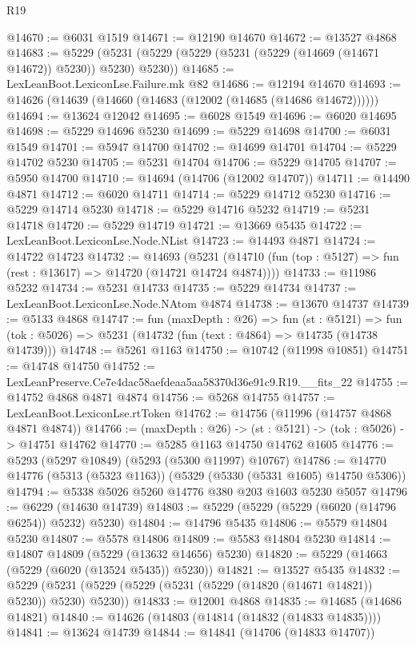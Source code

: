 \begin{lexlean}{R19}
\begin{coremodule}
@14670 := @6031 @1519
@14671 := @12190 @14670
@14672 := @13527 @4868
@14683 := @5229 (@5231 (@5229 (@5229 (@5231 (@5229 (@14669 (@14671 @14672)) @5230)) @5230) @5230))
@14685 := LexLeanBoot.LexiconLse.Failure.mk @82
@14686 := @12194 @14670
@14693 := @14626 (@14639 (@14660 (@14683 (@12002 (@14685 (@14686 @14672))))))
@14694 := @13624 @12042
@14695 := @6028 @1549
@14696 := @6020 @14695
@14698 := @5229 @14696 @5230
@14699 := @5229 @14698
@14700 := @6031 @1549
@14701 := @5947 @14700
@14702 := @14699 @14701
@14704 := @5229 @14702 @5230
@14705 := @5231 @14704
@14706 := @5229 @14705
@14707 := @5950 @14700
@14710 := @14694 (@14706 (@12002 @14707))
@14711 := @14490 @4871
@14712 := @6020 @14711
@14714 := @5229 @14712 @5230
@14716 := @5229 @14714 @5230
@14718 := @5229 @14716 @5232
@14719 := @5231 @14718
@14720 := @5229 @14719
@14721 := @13669 @5435
@14722 := LexLeanBoot.LexiconLse.Node.NList
@14723 := @14493 @4871
@14724 := @14722 @14723
@14732 := @14693
    (@5231 (@14710 (fun (top : @5127) => fun (rest : @13617) => @14720 (@14721 @14724 @4874))))
@14733 := @11986 @5232
@14734 := @5231 @14733
@14735 := @5229 @14734
@14737 := LexLeanBoot.LexiconLse.Node.NAtom @4874
@14738 := @13670 @14737
@14739 := @5133 @4868
@14747 := fun (maxDepth : @26) =>
  fun (st : @5121) =>
  fun (tok : @5026) => @5231 (@14732 (fun (text : @4864) => @14735 (@14738 @14739)))
@14748 := @5261 @1163
@14750 := @10742 (@11998 @10851)
@14751 := @14748 @14750
@14752 := LexLeanPreserve.Ce7e4dac58aefdeaa5aa58370d36e91c9.R19.__fits_22
@14755 := @14752 @4868 @4871 @4874
@14756 := @5268 @14755
@14757 := LexLeanBoot.LexiconLse.rtToken
@14762 := @14756 (@11996 (@14757 @4868 @4871 @4874))
@14766 := (maxDepth : @26) -> (st : @5121) -> (tok : @5026) -> @14751 @14762
@14770 := @5285 @1163 @14750 @14762 @1605
@14776 := @5293 (@5297 @10849) (@5293 (@5300 @11997) @10767)
@14786 := @14770 @14776 (@5313 (@5323 @1163)) (@5329 (@5330 (@5331 @1605) @14750 @5306))
@14794 := @5338 @5026 @5260 @14776 @380 @203 @1603 @5230 @5057
@14796 := @6229 (@14630 @14739)
@14803 := @5229 (@5229 (@5229 (@6020 (@14796 @6254)) @5232) @5230)
@14804 := @14796 @5435
@14806 := @5579 @14804 @5230
@14807 := @5578 @14806
@14809 := @5583 @14804 @5230
@14814 := @14807 @14809 (@5229 (@13632 @14656) @5230)
@14820 := @5229 (@14663 (@5229 (@6020 (@13524 @5435)) @5230))
@14821 := @13527 @5435
@14832 := @5229 (@5231 (@5229 (@5229 (@5231 (@5229 (@14820 (@14671 @14821)) @5230)) @5230) @5230))
@14833 := @12001 @4868
@14835 := @14685 (@14686 @14821)
@14840 := @14626 (@14803 (@14814 (@14832 (@14833 @14835))))
@14841 := @13624 @14739
@14844 := @14841 (@14706 (@14833 @14707))

\end{coremodule}
\end{lexlean}
